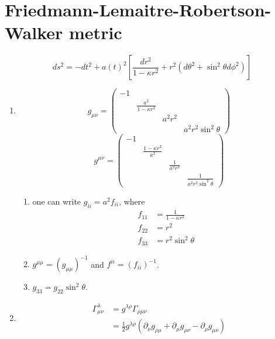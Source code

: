 \section{Friedmann-Lemaitre-Robertson-Walker metric}
      \begin{equation}
         ds^2 = -dt^2 + a(t)^2 [ \frac{dr^2}{1-\kappa r^2}+ r^2(d\theta^2+\sin^2{\theta}d\phi^2) ]
      \end{equation}
\begin{enumerate}[label=(\alph*)]
	\item 
		\begin{equation*}
		g_{\mu\nu} = 
			\begin{pmatrix}
			-1 	&  & &  \\
				& \frac{a^2}{1-\kappa r^2} & & \\
				& 	 & a^2 r^2 & \\
				& 	 & & a^2 r^2 \sin^2{\theta} 
			\end{pmatrix}		
		\end{equation*}
		\begin{equation*}
		g^{\mu\nu} = 
			\begin{pmatrix}
			-1 	&  & &  \\
				& \frac{1-\kappa r^2}{a^2} & & \\
				& 	 & \frac{1}{a^2 r^2} & \\
				& 	 & & \frac{1}{a^2 r^2 \sin^2{\theta}}
			\end{pmatrix}
		\end{equation*}
	\begin{enumerate} [label=(\roman*)]
	Note that:
	\item one can write $g_{ii} = a^2 f_{ii}$, where
		\begin{align*}
		f_{11} &= \frac{1}{1-\kappa r^2} \\
		f_{22} &= r^2 \\
		f_{33} &= r^2 \sin^2{\theta} 
		\end{align*}		
	\item $g^{\mu\mu}=(g_{\mu\mu})^{-1}$ and $f^{ii}=(f_{ii})^{-1}$. 
	\item $g_{33}=g_{22}\sin^2{\theta}$.
	\end{enumerate}
	\item 
		\begin{align*}
		\Gamma^\lambda_{\mu\nu}  & = g^{\lambda\rho}\Gamma_{\rho\mu\nu} \\
					    & = \frac{1}{2} g^{\lambda\rho} ( \partial_\nu g_{\rho\mu} + \partial_\mu g_{\rho\nu} - \partial_\rho g_{\mu\nu} ) 
		\end{align*}

\end{enumerate}
